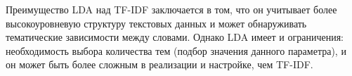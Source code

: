 Преимущество LDA над TF-IDF заключается в том, что он учитывает более высокоуровневую структуру текстовых данных и может обнаруживать тематические зависимости между словами. Однако LDA имеет и ограничения: необходимость выбора количества тем (подбор значения данного параметра), и он может быть более сложным в реализации и настройке, чем TF-IDF.

\pagebreak